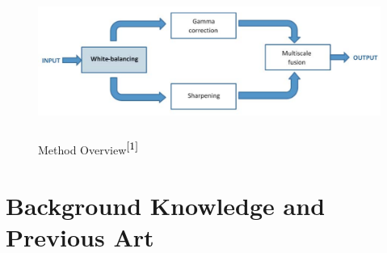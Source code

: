 \documentclass[hidelinks, 12pt]{report}
\begin{document}
\begin{figure}[H]
\centering
\includegraphics[width=15cm,height=5cm]{Block.png}
\caption[Method Overview]{Method Overview$^{\cite{1}}$}
\label{Overview}
\end{figure}
\chapter{Background Knowledge and Previous Art}
\fancyhf{}
\fancyhead[r]{%
   \itshape
   \footnotesize{\chaptermark}
   \leftmark}

\fancyfoot[RE,RO]{\footnotesize\thepage}
 
\end{document}
